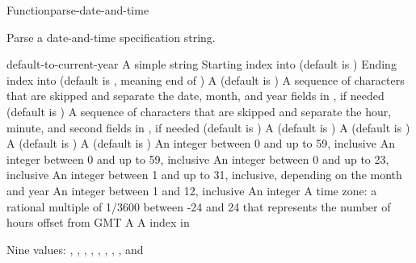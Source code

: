 \documentclass[10pt,twoside,english,pdftex]{article}
\begin{document}
\begin{functiondoc}{Function}{parse-date-and-time}{%
     
    }
% 

\fnsyntax

\fnpurpose Parse a date-and-time specification string.

\fnpackage {} 

\fnmodule {}

\fnargs
\begin{args}{default-to-current-year}
\arg[string] A simple string
\arg[start] Starting index into  (default is )
\arg[end] Ending index into  (default is \nil, meaning
end of )
 A  (default is \nil)
 A sequence of characters that are skipped and separate the
 date, month, and year fields in , if needed (default is 
 )
 A sequence of characters that are skipped and separate the
 hour, minute, and second fields in , if needed (default is 
 )
 A  (default is 
)
 A  (default is
)
 A  (default is \nil)
 A  (default is
)
\arg[second] An integer between 0 and up to 59, inclusive
\arg[minute] An integer between 0 and up to 59, inclusive
\arg[hour] An integer between 0 and up to 23, inclusive
\arg[date] An integer between 1 and up to 31, inclusive, depending
  on the month and year
\arg[month] An integer between 1 and 12, inclusive
\arg[year] An integer
 A time zone: a rational multiple of 1/3600 between
 -24 and 24 that represents the number of hours offset from GMT
 A 
\arg[position] A index in 
\end{args}

\fnreturns Nine values: , , , ,
, , ,
, and 


\end{functiondoc}
\end{document}
